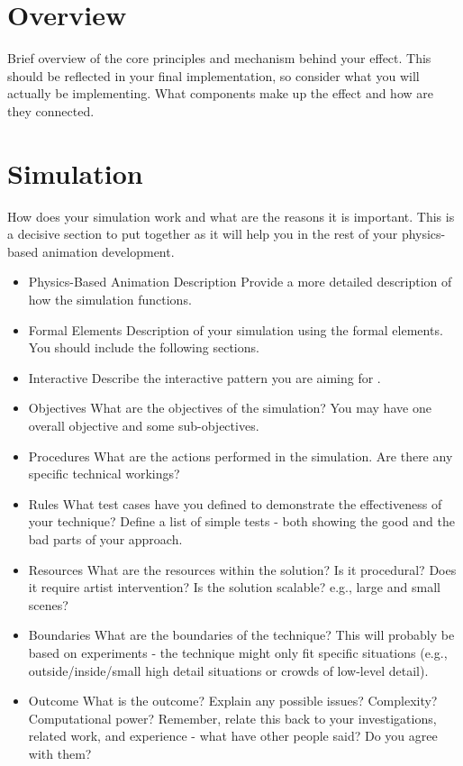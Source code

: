 \documentclass[conference,backref=page]{acmsiggraph}
\begin{document}
\section{Overview}
Brief overview of the core principles and mechanism behind your effect.  This should be reflected in your final implementation, so consider what you will actually be implementing. What components make up the effect and how are they connected.


\section{Simulation}

How does your simulation work and what are the reasons it is important.  This is a decisive section to put together as it will help you in the rest of your physics-based animation development.

\begin{itemize}
\item{Physics-Based Animation Description}
Provide a more detailed description of how the simulation functions.
\item{Formal Elements}
Description of your simulation using the formal elements.  You should include the following sections.
\item{Interactive}
Describe the interactive pattern you are aiming for .
\item{Objectives}
What are the objectives of the simulation?  You may have one overall objective and some sub-objectives.
\item{Procedures}
What are the actions performed in the simulation.  Are there any specific technical workings?
\item{Rules}
What test cases have you defined to demonstrate the effectiveness of your technique?  Define a list of simple tests - both showing the good and the bad parts of your approach.
\item{Resources}
What are the resources within the solution?  Is it procedural?  Does it require artist intervention?  Is the solution scalable?  e.g., large and small scenes?
\item{Boundaries}
What are the boundaries of the technique?  This will probably be based on experiments - the technique might only fit specific situations (e.g., outside/inside/small high detail situations or crowds of low-level detail).
\item{Outcome}
What is the outcome?  Explain any possible issues?  Complexity? Computational power? Remember, relate this back to your investigations, related work, and experience - what have other people said?  Do you agree with them?
\end{itemize}
\end{document}
